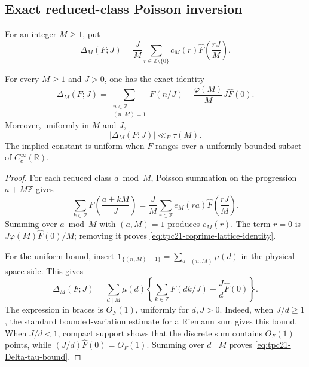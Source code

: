 \subsection{Exact reduced-class Poisson inversion}

For an integer \(M\ge1\), put
\begin{equation}
 \Delta_M(F;J)
 =\frac JM\sum_{r\in\mathbb Z\setminus\{0\}}
 c_M(r)\widehat F\!\left(\frac{rJ}{M}\right).
 \label{eq:tpc21-Delta-definition}
\end{equation}

\begin{proposition}
\label{prop:tpc21-coprime-lattice-identity}
For every \(M\ge1\) and \(J>0\), one has the exact identity
\begin{equation}
 \boxed{
 \Delta_M(F;J)
 =\sum_{\substack{n\in\mathbb Z\\(n,M)=1}}F(n/J)
 -\frac{\varphi(M)}M J\widehat F(0).}
 \label{eq:tpc21-coprime-lattice-identity}
\end{equation}
Moreover, uniformly in \(M\) and \(J\),
\begin{equation}
 |\Delta_M(F;J)|\ll_F\tau(M).
 \label{eq:tpc21-Delta-tau-bound}
\end{equation}
The implied constant is uniform when \(F\) ranges over a uniformly
bounded subset of \(C_c^\infty(\mathbb R)\).
\end{proposition}

\begin{proof}
For each reduced class \(a\bmod M\), Poisson summation on the
progression \(a+M\mathbb Z\) gives
\[
 \sum_{k\in\mathbb Z}F\!\left(\frac{a+kM}{J}\right)
 =\frac JM\sum_{r\in\mathbb Z}
 e_M(ra)\widehat F\!\left(\frac{rJ}{M}\right).
\]
Summing over \(a\bmod M\) with \((a,M)=1\) produces \(c_M(r)\).
The term \(r=0\) is
\(J\varphi(M)\widehat F(0)/M\); removing it proves
\eqref{eq:tpc21-coprime-lattice-identity}.

For the uniform bound, insert
\(
 \mathbf 1_{\{(n,M)=1\}}=\sum_{d\mid(n,M)}\mu(d)
\)
in the physical-space side.  This gives
\begin{equation}
 \Delta_M(F;J)
 =\sum_{d\mid M}\mu(d)
 \left\{
  \sum_{k\in\mathbb Z}F(dk/J)-\frac Jd\widehat F(0)
 \right\}.
 \label{eq:tpc21-Delta-Mobius-expansion}
\end{equation}
The expression in braces is \(O_F(1)\), uniformly for \(d,J>0\).
Indeed, when \(J/d\ge1\), the standard bounded-variation estimate for
a Riemann sum gives this bound.  When \(J/d<1\), compact support shows
that the discrete sum contains \(O_F(1)\) points, while
\((J/d)\widehat F(0)=O_F(1)\).  Summing over \(d\mid M\) proves
\eqref{eq:tpc21-Delta-tau-bound}.
\end{proof}

